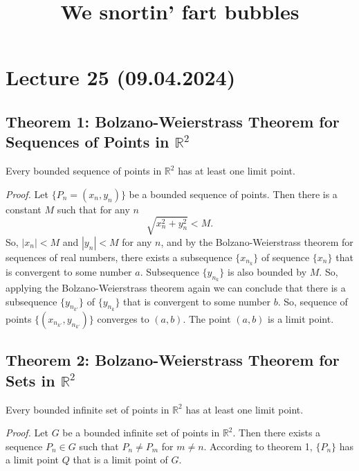 \documentclass{article}
\title{We snortin' fart bubbles}
\begin{document}
\maketitle

\section*{Lecture 25 (09.04.2024)}

\subsection*{Theorem 1: Bolzano-Weierstrass Theorem for Sequences of Points in $\mathbb{R}^2$}

\begin{theorem}
Every bounded sequence of points in $\mathbb{R}^2$ has at least one limit point.
\end{theorem}

\vspace{1em}

\textit{Proof.} Let $\{P_n = (x_n, y_n)\}$ be a bounded sequence of points. Then there is a constant $M$ such that for any $n$
\[
\sqrt{x_n^2 + y_n^2} < M.
\]
So, $|x_n| < M$ and $|y_n| < M$ for any $n$, and by the Bolzano-Weierstrass theorem for sequences of real numbers, there exists a subsequence $\{x_{n_k}\}$ of sequence $\{x_n\}$ that is convergent to some number $a$. Subsequence $\{y_{n_k}\}$ is also bounded by $M$. So, applying the Bolzano-Weierstrass theorem again we can conclude that there is a subsequence $\{y_{n_{k'}}\}$ of $\{y_{n_k}\}$ that is convergent to some number $b$. So, sequence of points $\{(x_{n_{k'}}, y_{n_{k'}})\}$ converges to $(a, b)$. The point $(a, b)$ is a limit point.

\subsection*{Theorem 2: Bolzano-Weierstrass Theorem for Sets in $\mathbb{R}^2$}

\begin{theorem}
Every bounded infinite set of points in $\mathbb{R}^2$ has at least one limit point.
\end{theorem}

\vspace{1em}

\textit{Proof.} Let $G$ be a bounded infinite set of points in $\mathbb{R}^2$. Then there exists a sequence $P_n \in G$ such that $P_n \neq P_m$ for $m \neq n$. According to theorem 1, $\{P_n\}$ has a limit point $Q$ that is a limit point of $G$.
\end{document}
